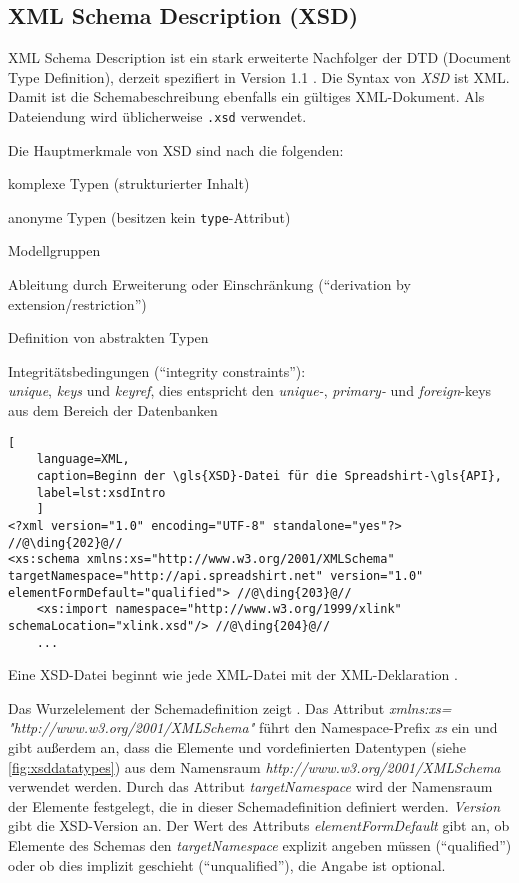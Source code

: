 \subsection{XML Schema Description (XSD)}
\label{sec:xsd}

\textsc{XML} Schema Description ist ein stark erweiterte Nachfolger der \gls{DTD} (Document Type Definition), derzeit spezifiert in Version 1.1 \cite{XMLSchema11Specification}. 
Die Syntax von \emph{\gls{XSD}} ist \gls{XML}. Damit ist die Schemabeschreibung ebenfalls ein gültiges \gls{XML}-Dokument. Als Dateiendung wird üblicherweise \texttt{.xsd} verwendet.

Die Hauptmerkmale von \gls{XSD} sind nach \cite[Kapitel 3.2][]{taxonomyXMLSchema} die folgenden:
\begin{compactitem}
    \item komplexe Typen (strukturierter Inhalt)
    \item anonyme Typen (besitzen kein \texttt{type}-Attribut)
    \item Modellgruppen
    \item Ableitung durch Erweiterung oder Einschränkung (\enquote{derivation by extension/restriction})
    \item Definition von abstrakten Typen
    \item Integritätsbedingungen (\enquote{integrity constraints}):\\
        \emph{unique}, \emph{keys} und \emph{keyref}, dies entspricht den \emph{unique-}, \emph{primary-} und \emph{foreign}-keys aus dem Bereich der Datenbanken        
\end{compactitem}

\begin{lstlisting}[
    language=XML,
    caption=Beginn der \gls{XSD}-Datei für die Spreadshirt-\gls{API},
    label=lst:xsdIntro
    ]
<?xml version="1.0" encoding="UTF-8" standalone="yes"?> //@\ding{202}@//
<xs:schema xmlns:xs="http://www.w3.org/2001/XMLSchema"  targetNamespace="http://api.spreadshirt.net" version="1.0" elementFormDefault="qualified"> //@\ding{203}@//
    <xs:import namespace="http://www.w3.org/1999/xlink" schemaLocation="xlink.xsd"/> //@\ding{204}@//
    ...
\end{lstlisting}

Eine \gls{XSD}-Datei beginnt wie jede \gls{XML}-Datei mit der \gls{XML}-Deklaration .

Das Wurzelelement der Schemadefinition zeigt . 
Das Attribut \emph{xmlns:xs= "http://www.w3.org/2001/XMLSchema"} führt den Namespace-Prefix \emph{xs} ein und gibt außerdem an, dass die Elemente und vordefinierten Datentypen (siehe \cref{fig:xsddatatypes}) aus dem Namensraum \emph{http://www.w3.org/2001/XMLSchema} verwendet werden. Durch das Attribut \emph{targetNamespace} wird der Namensraum der Elemente festgelegt, die in dieser Schemadefinition definiert werden. \emph{Version} gibt die \gls{XSD}-Version an.
Der Wert des Attributs \emph{elementFormDefault} gibt an, ob Elemente des Schemas den \emph{targetNamespace} explizit angeben müssen (\enquote{qualified}) oder ob dies implizit geschieht (\enquote{unqualified}), die Angabe ist optional.

